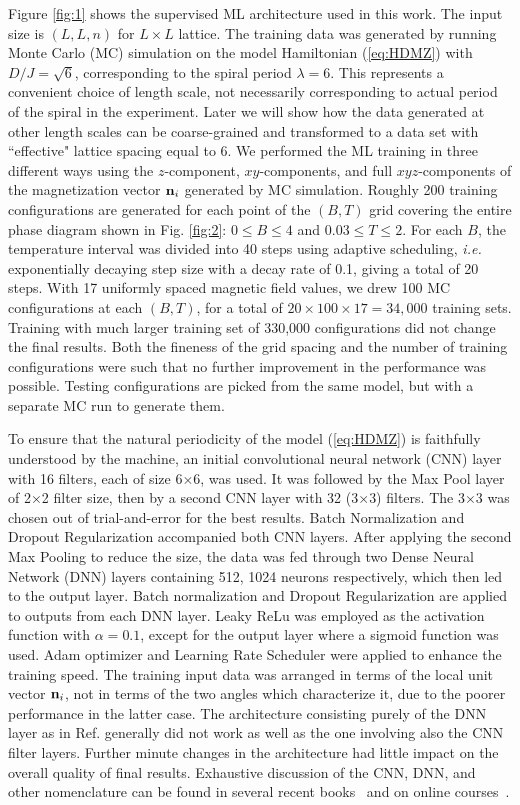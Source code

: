 \documentclass[reprint,amsmath,amssymb,aps,showpacs,superscriptaddress,prl]{revtex4-1}
\renewcommand{\v}[1]{{\bf #1}}
\begin{document}
Figure \ref{fig:1} shows the supervised ML architecture used in this work. The input size is $(L,L,n)$ for $L\times L$ lattice.  The training data was generated by running Monte Carlo (MC) simulation on the model Hamiltonian (\ref{eq:HDMZ}) with $D/J=\sqrt{6}$, corresponding to the spiral period $\lambda=6$. This represents a convenient choice of length scale, not necessarily corresponding to actual period of the spiral in the experiment. Later we will show how the data generated at other length scales can be coarse-grained and transformed to a data set with  ``effective" lattice spacing equal to 6. We performed the ML training in three different ways using the $z$-component, $xy$-components, and full $xyz$-components of the magnetization vector $\v n_i$ generated by MC simulation. Roughly 200 training configurations are generated for each point of the $(B, T)$ grid covering the entire phase diagram shown in Fig. \ref{fig:2}: $0 \le B \le 4$ and $0.03 \le T \le 2$. For each $B$, the temperature interval was divided into 40 steps using adaptive scheduling, {\it i.e.} exponentially decaying step size with a decay rate of 0.1, giving a total of 20 steps. With 17 uniformly spaced magnetic field values, we drew 100 MC configurations at each $(B,T)$, for a total of $20 \times 100\times 17 = 34,000$ training sets. Training with much larger training set of 330,000 configurations did not change the final results. Both the fineness of the grid spacing and the number of training configurations were such that no further improvement in the performance was possible.
Testing configurations are picked from the same model, but with a separate MC run to generate them.

To ensure that the natural periodicity of the model (\ref{eq:HDMZ}) is faithfully understood by the machine, an initial convolutional neural network (CNN) layer with 16 filters, each of size 6$\times$6, was used. It was followed by the Max Pool layer of 2$\times$2 filter size, then by a second CNN layer with 32 (3$\times$3) filters.  The 3$\times$3 was chosen out of trial-and-error for the best results. Batch Normalization and Dropout Regularization accompanied both CNN layers. After applying the second Max Pooling to reduce the size, the data was fed through two Dense Neural Network (DNN) layers containing 512, 1024 neurons respectively, which then led to the output layer. Batch normalization and Dropout Regularization are applied to outputs from each DNN layer. Leaky ReLu was employed as the activation function with $\alpha=0.1$, except for the output layer where a sigmoid function was used. Adam optimizer and Learning Rate Scheduler were applied to enhance the training speed.  The training input data was arranged in terms of the local unit vector $\v n_i$, not in terms of the two angles which characterize it, due to the poorer performance in the latter case. The architecture consisting purely of the DNN layer as in Ref. \cite{russian18} generally did not work as well as the one involving also the CNN filter layers. Further minute changes in the architecture had little impact on the overall quality of final results. Exhaustive discussion of the CNN, DNN, and other nomenclature can be found in several recent books~\cite{bishop,goodfellow} and on online courses~\cite{ng}.
\end{document}
